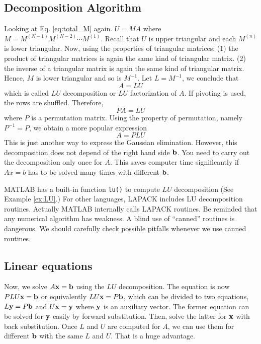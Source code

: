 \subsection{Decomposition Algorithm}
Looking at Eq. \eqref{eq:total_M} again. $U=M A$ where $M=M^{(N-1)} M^{(N-2)} \cdots M^{(1)}$.  Recall that $U$ is upper triangular and each $M^{(n)}$ is lower triangular.  Now, using the properties of triangular matrices:  (1) the product of triangular matrices is again the same kind of triangular matrix. (2) the inverse of a triangular matrix is again the same kind of triangular matrix.  Hence, $M$ is lower triangular and so is $M^{-1}$. Let $L=M^{-1}$, we conclude that
\begin{equation}
A = L U
\end{equation}
which is called $LU$ decomposition or $LU$ factorization of $A$.  If pivoting is used, the rows are shuffled.  Therefore,
\begin{equation}
P A = L U
\end{equation}
where $P$ is a permutation matrix. Using the property of permutation, namely $P^{-1} = P$, we obtain a more popular expression
\begin{equation}
A = P L U
\end{equation}
This is just another way to express the Gaussian elimination.  However, this decomposition does not depend of the right hand side $\vb{b}$.  You need to carry out the decomposition only once for $A$.  This saves computer time significantly if $Ax=b$  has to be solved many times with different $\vb{b}$.

MATLAB has a built-in function \texttt{lu()} to compute $LU$ decomposition (See Example \ref{ex:LU}.) For other languages, LAPACK includes LU decomposition routines. Actually MATLAB internally calls LAPACK routines.  Be reminded that any numerical algorithm has weakness.  A blind use of ``canned'' routines is dangerous. We should  carefully check possible pitfalls whenever we use canned routines.

\subsection{Linear equations}
Now, we solve $A \vb{x}=\vb{b}$ using the $LU$ decomposition. The equation is now $P L U \vb{x} = \vb{b}$ or equivalently $LU \vb{x} = P \vb{b}$, which can be divided to two equations, $L \vb{y} = P \vb{b}$ and $U \vb{x} = \vb{y}$ where $\vb{y}$ is an auxiliary vector.  The former equation can be solved for $\vb{y}$ easily by forward substitution.  Then, solve the latter for $\vb{x}$ with back substitution.  Once $L$ and $U$ are computed for $A$, we can use them for different $\vb{b}$ with the same $L$ and $U$. That is a huge advantage. 

